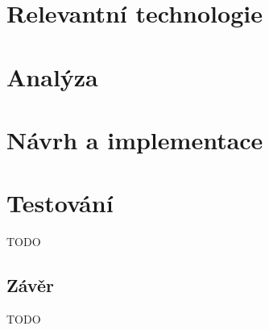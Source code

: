 \documentclass{ctuthesis}
\begin{document}
\maketitle



\part{Relevantní technologie}




\part{Analýza}



\part{Návrh a implementace}




\part{Testování}

TODO

\chapter{Závěr}

TODO

\appendix

\printbibliography[title={Seznam literatury}]
\end{document}
